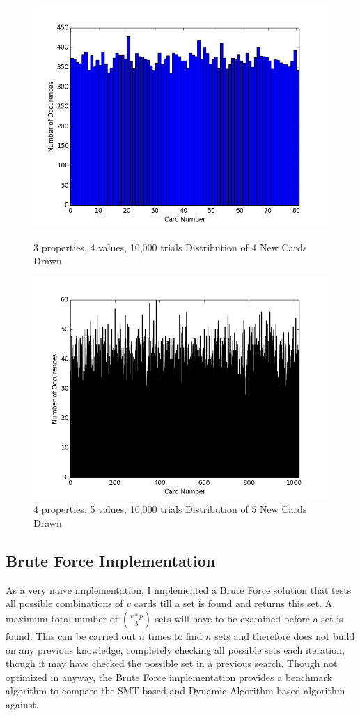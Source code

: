 \documentclass[pageno]{jpaper}
\begin{document}
\begin{figure}[htbb]
\begin{minipage}[b]{0.5\linewidth}
\centering
\includegraphics[width=.75\linewidth]{3p4v10000Draw.png}
\caption{3 properties, 4 values, 10,000 trials Distribution of $4$ New Cards Drawn}
\label{fig:draw1}
\end{minipage}
\hspace{0.5cm}
\begin{minipage}[b]{0.5\linewidth}
\centering
\includegraphics[width=.75\linewidth]{4p5v10000Draw.png}
\caption{4 properties, 5 values, 10,000 trials Distribution of $5$ New Cards Drawn}
\label{fig:draw2}
\end{minipage}
\end{figure}





\subsection{Brute Force Implementation}

As a very naive implementation, I implemented a Brute Force solution that tests all possible combinations of $v$ cards till a set is found and returns this set. A maximum total number of ${v*p}\choose{3}$ sets will have to be examined before a set is found. This can be carried out $n$ times to find $n$ sets and therefore does not build on any previous knowledge, completely checking all possible sets each iteration, though it may have checked the possible set in a previous search. Though not optimized in anyway, the Brute Force implementation provides a benchmark algorithm to compare the SMT based and Dynamic Algorithm based algorithm against. 
\end{document}
